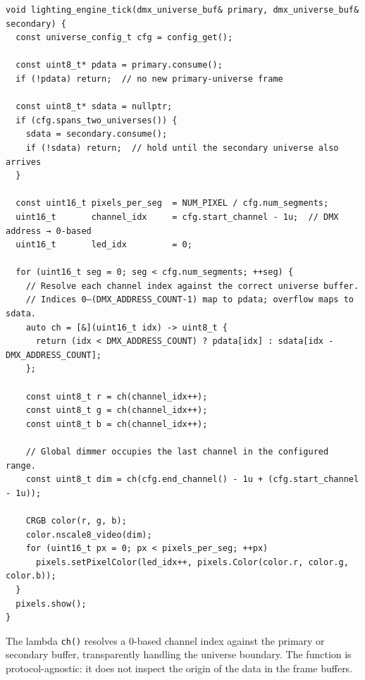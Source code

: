 \begin{longlisting}
\begin{verbatim}
void lighting_engine_tick(dmx_universe_buf& primary, dmx_universe_buf& secondary) {
  const universe_config_t cfg = config_get();

  const uint8_t* pdata = primary.consume();
  if (!pdata) return;  // no new primary-universe frame

  const uint8_t* sdata = nullptr;
  if (cfg.spans_two_universes()) {
    sdata = secondary.consume();
    if (!sdata) return;  // hold until the secondary universe also arrives
  }

  const uint16_t pixels_per_seg  = NUM_PIXEL / cfg.num_segments;
  uint16_t       channel_idx     = cfg.start_channel - 1u;  // DMX address → 0-based
  uint16_t       led_idx         = 0;

  for (uint16_t seg = 0; seg < cfg.num_segments; ++seg) {
    // Resolve each channel index against the correct universe buffer.
    // Indices 0–(DMX_ADDRESS_COUNT-1) map to pdata; overflow maps to sdata.
    auto ch = [&](uint16_t idx) -> uint8_t {
      return (idx < DMX_ADDRESS_COUNT) ? pdata[idx] : sdata[idx - DMX_ADDRESS_COUNT];
    };

    const uint8_t r = ch(channel_idx++);
    const uint8_t g = ch(channel_idx++);
    const uint8_t b = ch(channel_idx++);

    // Global dimmer occupies the last channel in the configured range.
    const uint8_t dim = ch(cfg.end_channel() - 1u + (cfg.start_channel - 1u));

    CRGB color(r, g, b);
    color.nscale8_video(dim);
    for (uint16_t px = 0; px < pixels_per_seg; ++px)
      pixels.setPixelColor(led_idx++, pixels.Color(color.r, color.g, color.b));
  }
  pixels.show();
}
\end{verbatim}
\caption{Lighting engine tick function.}
\label{lst:lighting_engine_tick}
\end{longlisting}

The lambda \texttt{ch()} resolves a 0-based channel index against the primary or secondary buffer, transparently handling the universe boundary.
The function is protocol-agnostic: it does not inspect the origin of the data in the frame buffers.
